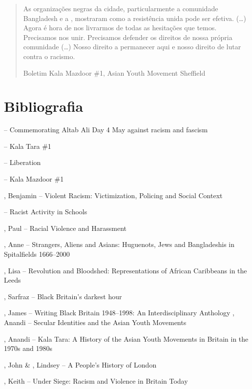 \begin{quote}
As organizações negras da cidade, particularmente a comunidade Bangladesh e a , mostraram como a resistência unida pode ser efetiva. (\ldots{}) Agora é hora de nos livrarmos de todas as hesitações que temos. Precisamos nos unir. Precisamos defender os direitos de nossa própria comunidade (\ldots{}) Nosso direito a permanecer aqui e nosso direito de lutar contra o racismo.

Boletim Kala Mazdoor \#1, Asian Youth Movement Sheffield
\end{quote}


\section{Bibliografia}

\begin{Parskip}
 -- Commemorating Altab Ali Day 4 May against racism and fascism

 -- Kala Tara \#1

 -- Liberation

 -- Kala Mazdoor \#1

, Benjamin -- Violent Racism: Victimization, Policing and Social Context

 -- Racist Activity in Schools

, Paul -- Racial Violence and Harassment

, Anne -- Strangers, Aliens and Asians: Huguenots, Jews and Bangladeshis in Spitalfields 1666--2000

, Lisa -- Revolution and Bloodshed: Representations of African Caribbeans in the Leeds

, Sarfraz -- Black Britain's darkest hour

, James -- Writing Black Britain 1948--1998: An Interdisciplinary Anthology
, Anandi -- Secular Identities and the Asian Youth Movements

, Anandi -- Kala Tara: A History of the Asian Youth Movements in Britain in the 1970s and 1980s

, John \& , Lindsey -- A People's History of London

, Keith -- Under Siege: Racism and Violence in Britain Today


\end{Parskip}
